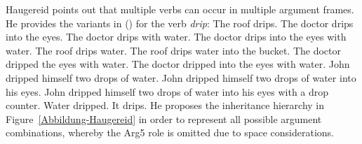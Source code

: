 \begin{exe}
\begin{xlist}[iv.]
\begin{exe}
\begin{xlist}[iv.]
\noindent
Haugereid points out that multiple verbs can occur in multiple argument frames. He provides the variants in ()
for the verb \emph{drip}:
\eal
\settowidth{}
\ex The roof drips.                    
\ex The doctor drips into the eyes.    
\ex The doctor drips with water.       
\ex The doctor drips into the eyes with water. 
\ex The roof drips water.                      
\ex The roof drips water into the bucket.      
\ex The doctor dripped the eyes with water.    
\ex The doctor dripped into the eyes with water. 
\ex John dripped himself two drops of water.     
\ex John dripped himself two drops of water into his eyes. 
\ex John dripped himself two drops of water into his eyes with a drop counter. 
\ex Water dripped. 
\ex It drips. 
\zl
He proposes the inheritance hierarchy in Figure~\ref{Abbildung-Haugereid} in order to represent all possible argument combinations, whereby
the Arg5 role is omitted due to space considerations.


\end{xlist}
\end{exe}
\end{xlist}
\end{exe}
